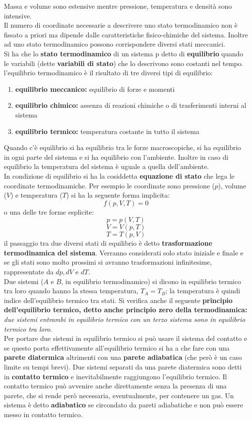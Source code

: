 \documentclass[a4paper,12pt, oneside]{book}
\begin{document}
Massa e volume sono estensive mentre pressione, temperatura e densità sono intensive.\\
Il numero di coordinate necessarie a descrivere uno stato termodinamico non è fissato a priori ma dipende dalle caratteristiche fisico-chimiche del sistema. Inoltre ad uno stato termodinamico possono corrispondere diversi stati meccanici. \\
Si ha che lo \textbf{stato termodinamico} di un sistema p detto di \textbf{equilibrio} quando le variabili (dette \textbf{variabili di stato}) che lo descrivono sono costanti nel tempo.\\
l'equilibrio termodinamico è il risultato di tre diversi tipi di equilibrio:
\begin{enumerate}
\item \textbf{equilibrio meccanico:} equilibrio di forze e momenti
\item \textbf{equilibrio chimico:} assenza di reazioni chimiche o di trasferimenti interni al sistema
\item \textbf{equilibrio termico:} temperatura costante in tutto il sistema
\end{enumerate}
Quando c'è equilibrio si ha equilibrio tra le forze macroscopiche, si ha equilibrio in ogni parte del sistema e si ha equilibrio con l'ambiente. Inoltre in caso di equilibrio la temperatura del sistema è uguale a quella dell'ambiente.\\
In condizione di equilibrio si ha la cosiddetta \textbf{equazione di stato} che lega le coordinate termodinamiche. Per esempio le coordinate sono pressione ($p$), volume ($V$) e temperatura ($T$) si ha la seguente forma implicita:
$$f(p,V,T)=0$$
o una delle tre forme esplicite:
$$p=p(V,T)$$ 
$$V=V(p,T)$$ 
$$T=T(p,V)$$
il passaggio tra due diversi stati di equilibrio è detto \textbf{trasformazione termodinamica del sistema}. Verranno considerati solo stato iniziale e finale e se gli stati sono molto prossimi si avranno trasformazioni infinitesime, rappresentate da $dp, dV \mbox{ e } dT$.\\
Due sistemi ($A$ e $B$, in equilibrio termodinamico) si dicono in equilibrio termico tra loro quando hanno la stessa temperatura, $T_A=T_B$; la temperatura è quindi indice dell'equilibrio termico tra stati. Si verifica anche il seguente \textbf{principio dell'equilibrio termico, detto anche principio zero della termodinamica:}\\
\textit{due sistemi entrambi in equilibrio termico con un terzo sistema sono in equilibrio termico tra loro}.\\
Per portare due sistemi in equilibrio termico si può usare il sistema del contatto e se questo porta effettivamente all'equilibrio termico si ha a che fare con una \textbf{parete diatermica} altrimenti con una \textbf{parete adiabatica} (che però è un caso limite su tempi brevi). Due sistemi separati da una parete diatermica sono detti in \textbf{contatto termico} e inevitabilmente raggiungono l'equilibrio termico. Il contatto termico può avvenire anche direttamente senza la presenza di una parete, che si rende però necessaria, eventualmente, per contenere un gas. Un sistema è detto \textbf{adiabatico} se circondato da pareti adiabatiche e non può essere messo in contatto termico.
\end{document}
